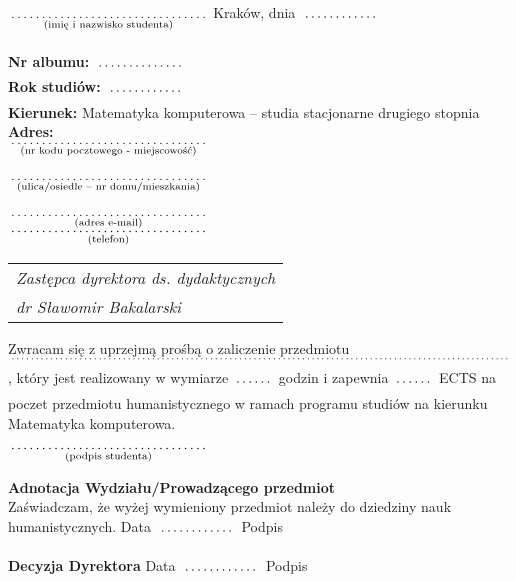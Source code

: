 \documentclass[a4paper,11pt]{article}
\newcommand{\fillField}[2]{
    $\underset{\text{#1}}{\parbox[t]{#2}{\dotfill}}$
}
\begin{document}
\noindent
\fillField{(imię i nazwisko studenta)}{5cm} \hfill Kraków, dnia \fillField{}{2cm} \\\\
\textbf{Nr albumu:}   \fillField{}{2.3cm}\\
\textbf{Rok studiów:} \fillField{}{2cm}\\
\textbf{Kierunek:} Matematyka komputerowa -- studia stacjonarne drugiego stopnia\\
\textbf{Adres:}\\
\fillField{(nr kodu pocztowego - miejscowość)}{5cm}\\\\
\fillField{(ulica/osiedle – nr domu/mieszkania)}{5cm}\\\\
\fillField{(adres e-mail)}{5cm}\\
\fillField{(telefon)}{5cm}
\phantom{a}\hfill
\begin{tabular}[c]{@{}l@{}}
\textit{Zastępca dyrektora ds. dydaktycznych}\\
\textit{dr Sławomir Bakalarski}
\end{tabular}

\vskip 2.0cm


\noindent
Zwracam się z uprzejmą prośbą o zaliczenie przedmiotu\\
\fillField{}{16cm}, który jest realizowany w wymiarze \fillField{}{1cm} godzin
i zapewnia \fillField{}{1cm} ECTS na poczet
przedmiotu humanistycznego w ramach programu studiów na kierunku Matematyka komputerowa.

\vskip 1cm

\hspace{\fill} \fillField{(podpis studenta)}{5cm} \hspace{2.0cm}
\vskip 3.0cm

\noindent
\textbf{Adnotacja Wydziału/Prowadzącego przedmiot} \\
Zaświadczam, że wyżej wymieniony przedmiot należy do dziedziny nauk humanistycznych.
\vskip 0.5cm
\noindent
Data \fillField{}{2cm} Podpis \dotfill

\vskip 1.5cm

\noindent
\textbf{Decyzja Dyrektora} \dotfill
\vskip 0.5cm
\noindent
Data \fillField{}{2cm} Podpis \dotfill
\end{document}
